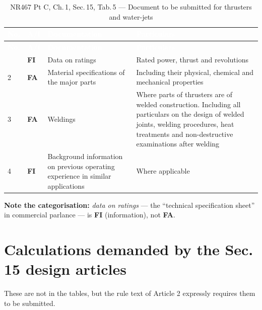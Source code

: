\documentclass[11pt,a4paper]{report}
\newcommand{\fa}{\textbf{\textcolor{warningred}{FA}}}
\newcommand{\fic}{\textbf{\textcolor{bvgray}{FI}}}
\begin{document}
\begin{longtable}{|p{0.7cm}|p{1.1cm}|p{6.2cm}|p{6.0cm}|}
\caption{NR467 Pt C, Ch.\,1, Sec.\,15, Tab.\,5 --- Document to be submitted for thrusters and water-jets} \label{tab:s15t5} \\
\hline
\rowcolor{bvblue}
\textcolor{white}{\textbf{No.}} & \textcolor{white}{\textbf{A/I}} & \textcolor{white}{\textbf{Documentation}} & \textcolor{white}{\textbf{Particulars}} \\
\hline
\endfirsthead
\hline
\rowcolor{bvblue}
\textcolor{white}{\textbf{No.}} & \textcolor{white}{\textbf{A/I}} & \textcolor{white}{\textbf{Documentation}} & \textcolor{white}{\textbf{Particulars}} \\
\hline
\endhead
\hline
\endlastfoot
1 & \fic{} & Data on ratings & Rated power, thrust and revolutions \\
\hline
2 & \fa{} & Material specifications of the major parts & Including their physical, chemical and mechanical properties \\
\hline
3 & \fa{} & Weldings & Where parts of thrusters are of welded construction. Including all particulars on the design of welded joints, welding procedures, heat treatments and non-destructive examinations after welding \\
\hline
4 & \fic{} & Background information on previous operating experience in similar applications & Where applicable \\
\hline
\end{longtable}

\noindent\textbf{Note the categorisation:} \emph{data on ratings} --- the
``technical specification sheet'' in commercial parlance --- is \fic{}
(information), not \fa{}.

\section{Calculations demanded by the Sec.\,15 design articles}

These are not in the tables, but the rule text of Article 2 expressly requires
them to be submitted.
\end{document}
